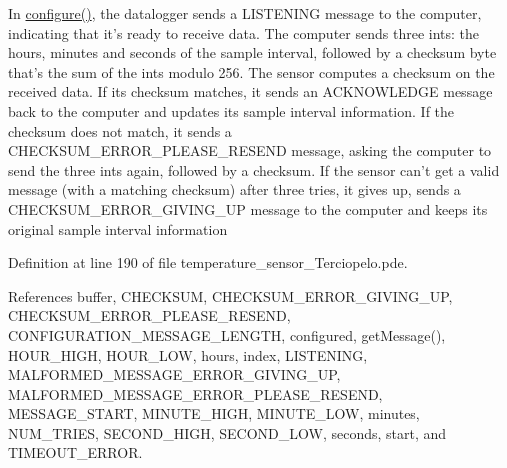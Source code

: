 In \hyperlink{applet_2nublogger_8h_e369b3765489ee8bd0ea791c1843630f}{configure()}, the datalogger sends a LISTENING message to the computer, indicating that it's ready to receive data. The computer sends three ints: the hours, minutes and seconds of the sample interval, followed by a checksum byte that's the sum of the ints modulo 256. The sensor computes a checksum on the received data. If its checksum matches, it sends an ACKNOWLEDGE message back to the computer and updates its sample interval information. If the checksum does not match, it sends a CHECKSUM\_\-ERROR\_\-PLEASE\_\-RESEND message, asking the computer to send the three ints again, followed by a checksum. If the sensor can't get a valid message (with a matching checksum) after three tries, it gives up, sends a CHECKSUM\_\-ERROR\_\-GIVING\_\-UP message to the computer and keeps its original sample interval information 

Definition at line 190 of file temperature\_\-sensor\_\-Terciopelo.pde.

References buffer, CHECKSUM, CHECKSUM\_\-ERROR\_\-GIVING\_\-UP, CHECKSUM\_\-ERROR\_\-PLEASE\_\-RESEND, CONFIGURATION\_\-MESSAGE\_\-LENGTH, configured, getMessage(), HOUR\_\-HIGH, HOUR\_\-LOW, hours, index, LISTENING, MALFORMED\_\-MESSAGE\_\-ERROR\_\-GIVING\_\-UP, MALFORMED\_\-MESSAGE\_\-ERROR\_\-PLEASE\_\-RESEND, MESSAGE\_\-START, MINUTE\_\-HIGH, MINUTE\_\-LOW, minutes, NUM\_\-TRIES, SECOND\_\-HIGH, SECOND\_\-LOW, seconds, start, and TIMEOUT\_\-ERROR.

